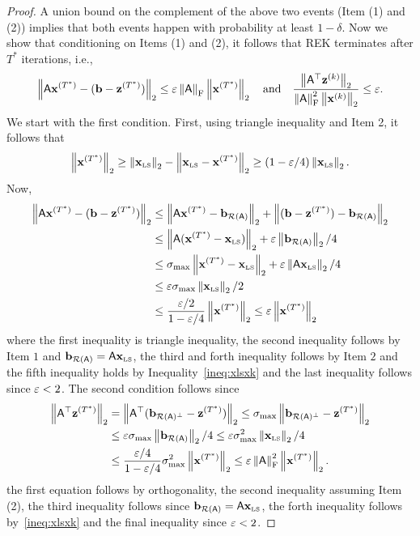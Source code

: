 \begin{proof}
%
A union bound on the complement of the above two events (Item (1) and (2)) implies that both events happen with probability at least $1-\delta$. Now we show that conditioning on Items (1) and (2), it follows that REK terminates after $T^*$ iterations, i.e.,
\[ \norm{\matA \x^{(T^*)} - (\b - \z^{(T^*)}) } \leq \eps \frobnorm{\matA}\norm{\x^{(T^*)}}\quad \text{and}\quad \frac{\norm{\matA^\top \z^{(k)}}}{\frobnorm{\matA}^2\norm{\x^{(k)}}} \leq \eps.\]
We start with the first condition. First, using triangle inequality and Item 2, it follows that
\begin{equation}\label{ineq:xlsxk}
\norm{\x^{(T^*)}} \geq  \norm{\xls} - \norm{\xls-\x^{(T^*)}}  \geq (1 - \eps/4 ) \norm{\xls}.
\end{equation}
Now,
\begin{align*}
	\norm{\matA \x^{(T^*)} - (\b - \z^{(T^*)}) } & \leq \norm{\matA \x^{(T^*)} - \br} + \norm{ (\b - \z^{(T^*)}) - \br } \\
	 											 & \leq \norm{\matA (\x^{(T^*)} - \xls)} + \eps \norm{\br} / 4 \\
		 										 & \leq \sigma_{\max} \norm{\x^{(T^*)} - \xls} + \eps \norm{\matA\xls} / 4 \\
												 & \leq \eps \sigma_{\max} \norm{\xls} /2 \\
												 & \leq \frac{\eps/2}{1- \eps/4} \norm{\x^{(T^*)}} \leq \eps \norm{\x^{(T^*)}}
\end{align*}
where the first inequality is triangle inequality, the second inequality follows by Item $1$ and $\br =\matA\xls$, the third and forth inequality follows by Item $2$ and the fifth inequality holds by Inequality~\eqref{ineq:xlsxk} and the last inequality follows since $\eps < 2$.
The second condition follows since
\begin{align*}
	\norm{\matA^\top \z^{(T^*)}} & = \norm{\matA^\top (\bc - \z^{(T^*)})}  \leq \sigma_{\max} \norm{\bc - \z^{(T^*)}} \\
								 & \leq \eps \sigma_{\max} \norm{\br}/4  \leq \eps \sigma^2_{\max} \norm{\xls}/4 \\
								 & \leq \frac{\eps/4}{1-\eps /4} \sigma^2_{\max} \norm{\x^{(T^*)} } \leq \eps \frobnorm{\matA}^2 \norm{\x^{(T^*)} }.
\end{align*}
the first equation follows by orthogonality, the second inequality assuming Item (2), the third inequality follows since $\br=\matA\xls$, the forth inequality follows by~\eqref{ineq:xlsxk} and the final inequality since $\eps <2$.
\end{proof}


